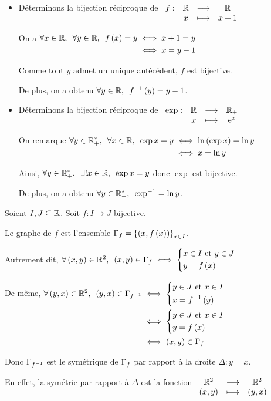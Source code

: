 \begin{ex}
\begin{itemize}
\item Déterminons la bijection réciproque de \(\begin{array}[t]{cccc}f : & \mathbb{R} & \longrightarrow & \mathbb{R} \\ & x & \longmapsto & x+1\end{array}\)

On a \(\quantifs{\forall x\in\R;\forall y\in\R}\begin{aligned}[t]
f\paren{x}=y&\iff x+1=y \\
&\iff x=y-1
\end{aligned}\)

Comme tout \(y\) admet un unique antécédent, \(f\) est bijective.

De plus, on a obtenu \(\quantifs{\forall y\in\R}f^{-1}\paren{y}=y-1\).

\item Déterminons la bijection réciproque de \(\begin{array}[t]{cccc}\exp : & \mathbb{R} & \longrightarrow & \mathbb{R}_+ \\ & x & \longmapsto & \mathrm{e}^{x}\end{array}\)

On remarque \(\begin{aligned}[t]
\quantifs{\forall y\in\Rps;\forall x\in\R}\exp x=y&\iff\ln\paren{\exp x}=\ln y \\
&\iff x=\ln y
\end{aligned}\)

Ainsi, \(\quantifs{\forall y\in\Rps;\exists! x\in\R}\exp x=y\) donc \(\exp\) est bijective.

De plus, on a obtenu \(\quantifs{\forall y\in\Rps}\exp^{-1}=\ln y\).
\end{itemize}
\end{ex}

\begin{rem}
Soient \(I,J\subseteq\mathbb{R}\). Soit \(f:I\to J\) bijective.

Le graphe de \(f\) est l'ensemble \(\Gamma_{f}=\left\lbrace\left(x,f\left(x\right)\right)\right\rbrace_{x\in I}\).

Autrement dit, \(\quantifs{\forall\paren{x,y}\in\R^2}\paren{x,y}\in\graphe{f}\iff\begin{dcases}x\in I\text{ et }y\in J \\ y=f\paren{x}\end{dcases}\)

De même, \(\quantifs{\forall\paren{y,x}\in\R^2}\begin{aligned}[t]
\paren{y,x}\in\graphe{f^{-1}}&\iff\begin{dcases}y\in J\text{ et }x\in I \\ x=f^{-1}\paren{y}\end{dcases} \\
&\iff\begin{dcases}y\in J\text{ et }x\in I \\ y=f\paren{x}\end{dcases} \\
&\iff\paren{x,y}\in\graphe{f}
\end{aligned}\)

Donc \(\Gamma_{f^{-1}}\) est le symétrique de \(\Gamma_{f}\) par rapport à la droite \(\Delta:y=x\).

En effet, la symétrie par rapport à \(\Delta\) est la fonction \(\begin{array}[t]{ccc}\mathbb{R}^2 & \longrightarrow & \mathbb{R}^2 \\ \left(x,y\right) & \longmapsto & \left(y,x\right)\end{array}\)
\end{rem}

